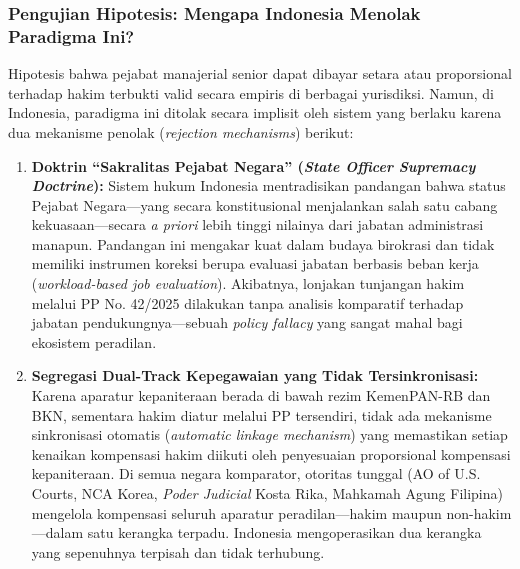 \documentclass[12pt, a4paper]{article}
\begin{document}
\subsubsection{Pengujian Hipotesis: Mengapa Indonesia Menolak Paradigma Ini?}

Hipotesis bahwa pejabat manajerial senior dapat dibayar setara atau proporsional terhadap hakim terbukti valid secara empiris di berbagai yurisdiksi. Namun, di Indonesia, paradigma ini ditolak secara implisit oleh sistem yang berlaku karena dua mekanisme penolak (\textit{rejection mechanisms}) berikut:

\begin{enumerate}
    \item \textbf{Doktrin ``Sakralitas Pejabat Negara'' (\textit{State Officer Supremacy Doctrine}):} Sistem hukum Indonesia mentradisikan pandangan bahwa status Pejabat Negara---yang secara konstitusional menjalankan salah satu cabang kekuasaan---secara \textit{a priori} lebih tinggi nilainya dari jabatan administrasi manapun. Pandangan ini mengakar kuat dalam budaya birokrasi dan tidak memiliki instrumen koreksi berupa evaluasi jabatan berbasis beban kerja (\textit{workload-based job evaluation}). Akibatnya, lonjakan tunjangan hakim melalui PP No. 42/2025 dilakukan tanpa analisis komparatif terhadap jabatan pendukungnya---sebuah \textit{policy fallacy} yang sangat mahal bagi ekosistem peradilan.
    \item \textbf{Segregasi Dual-Track Kepegawaian yang Tidak Tersinkronisasi:} Karena aparatur kepaniteraan berada di bawah rezim KemenPAN-RB dan BKN, sementara hakim diatur melalui PP tersendiri, tidak ada mekanisme sinkronisasi otomatis (\textit{automatic linkage mechanism}) yang memastikan setiap kenaikan kompensasi hakim diikuti oleh penyesuaian proporsional kompensasi kepaniteraan. Di semua negara komparator, otoritas tunggal (AO of U.S. Courts, NCA Korea, \textit{Poder Judicial} Kosta Rika, Mahkamah Agung Filipina) mengelola kompensasi seluruh aparatur peradilan---hakim maupun non-hakim---dalam satu kerangka terpadu. Indonesia mengoperasikan dua kerangka yang sepenuhnya terpisah dan tidak terhubung.
\end{enumerate}
\end{document}
